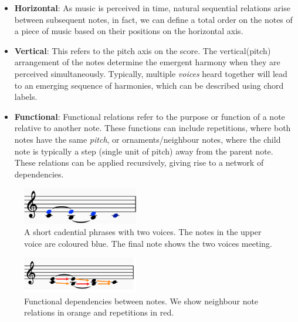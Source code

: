 \documentclass[12pt,a4paper,twoside,openright]{report}
\theoremstyle{definition}
\begin{document}
\begin{itemize}
  \item \textbf{Horizontal}: As music is perceived in time, natural sequential relations arise between subsequent notes, in fact, we can define a total order on the notes of a piece of music based on their positions on the horizontal axis.
  \item \textbf{Vertical}: This refers to the pitch axis on the score. The vertical(pitch) arrangement of the notes determine the emergent harmony when they are perceived simultaneously. Typically, multiple \textit{voices} heard together will lead to an emerging sequence of harmonies, which can be described using chord labels.
  \item \textbf{Functional}: Functional relations refer to the purpose or function of a note relative to another note. These functions can include repetitions, where both notes have the same \textit{pitch}, or ornaments/neighbour notes, where the child note is typically a step (single unit of pitch) away from the parent note. These relations can be applied recursively, giving rise to a network of dependencies.
\end{itemize}

\begin{figure}
  \centering
  \includegraphics[width=0.45\textwidth]{prep/cadencevoices}
  \captionsetup{width=.9\linewidth}
  \caption{A short cadential phrases with two voices. The notes in the upper voice are coloured blue. The final note shows the two voices meeting.}
  \label{fig:cadenceVoices}
\end{figure}

\begin{figure}
  \centering
  \includegraphics[width=0.45\textwidth]{prep/cadencefunctions}
  \captionsetup{width=.9\linewidth}
  \caption{Functional dependencies between notes. We show neighbour note relations in orange and repetitions in red.}
  \label{fig:cadenceFunctions}
\end{figure}
\end{document}
